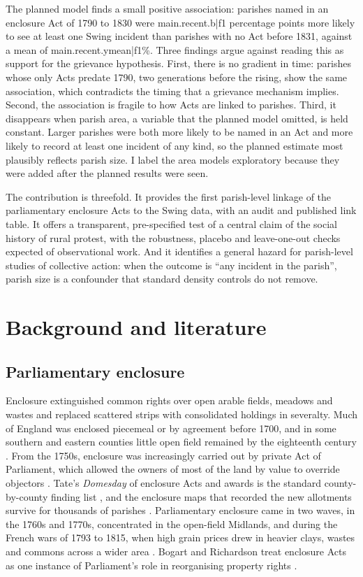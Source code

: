 \documentclass[11pt,a4paper]{article}
\begin{document}
The planned model finds a small positive association: parishes named in an enclosure Act of 1790 to 1830 were {{main.recent.b|f1}} percentage points more likely to see at least one Swing incident than parishes with no Act before 1831, against a mean of {{main.recent.ymean|f1}}\%. Three findings argue against reading this as support for the grievance hypothesis. First, there is no gradient in time: parishes whose only Acts predate 1790, two generations before the rising, show the same association, which contradicts the timing that a grievance mechanism implies. Second, the association is fragile to how Acts are linked to parishes. Third, it disappears when parish area, a variable that the planned model omitted, is held constant. Larger parishes were both more likely to be named in an Act and more likely to record at least one incident of any kind, so the planned estimate most plausibly reflects parish size. I label the area models exploratory because they were added after the planned results were seen.

The contribution is threefold. It provides the first parish-level linkage of the parliamentary enclosure Acts to the Swing data, with an audit and published link table. It offers a transparent, pre-specified test of a central claim of the social history of rural protest, with the robustness, placebo and leave-one-out checks expected of observational work. And it identifies a general hazard for parish-level studies of collective action: when the outcome is ``any incident in the parish'', parish size is a confounder that standard density controls do not remove.

\section{Background and literature}
\subsection{Parliamentary enclosure}
Enclosure extinguished common rights over open arable fields, meadows and wastes and replaced scattered strips with consolidated holdings in severalty. Much of England was enclosed piecemeal or by agreement before 1700, and in some southern and eastern counties little open field remained by the eighteenth century \citep{wordie1983}. From the 1750s, enclosure was increasingly carried out by private Act of Parliament, which allowed the owners of most of the land by value to override objectors \citep{turner1980,mingay1997}. Tate's \textit{Domesday} of enclosure Acts and awards is the standard county-by-county finding list \citep{tate1978}, and the enclosure maps that recorded the new allotments survive for thousands of parishes \citep{kain2004}. Parliamentary enclosure came in two waves, in the 1760s and 1770s, concentrated in the open-field Midlands, and during the French wars of 1793 to 1815, when high grain prices drew in heavier clays, wastes and commons across a wider area \citep{turner1980,turner1984}. Bogart and Richardson treat enclosure Acts as one instance of Parliament's role in reorganising property rights \citep{bogartrichardson2011}.
\end{document}
